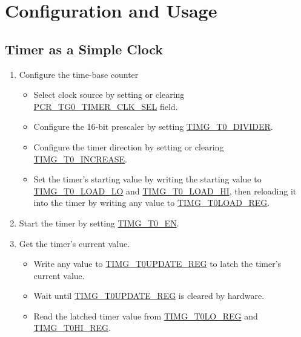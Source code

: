 \documentclass[main\_\_EN.tex]{subfiles}
\begin{document}
\section{Configuration and Usage}

\subsection{Timer as a Simple Clock}\label{sec:timg-func-descr-simple-clock}

\begin{enumerate}
    \item Configure the time-base counter
    \begin{itemize}
        \item Select clock source by setting or clearing \hyperref[fielddesc:PCRTG0TIMERCLKSEL]{PCR\_TG0\_TIMER\_CLK\_SEL} field.
        \item Configure the 16-bit prescaler by setting \hyperref[fielddesc:TIMGTXDIVIDER]{TIMG\_T0\_DIVIDER}.
        \item Configure the timer direction by setting or clearing \hyperref[fielddesc:TIMGTXINCREASE]{TIMG\_T0\_INCREASE}.
        \item Set the timer's starting value by writing the starting value to \hyperref[fielddesc:TIMGTXLOADLO]{TIMG\_T0\_LOAD\_LO} and \hyperref[fielddesc:TIMGTXLOADHI]{TIMG\_T0\_LOAD\_HI}, then reloading it into the timer by writing any value to \hyperref[regdesc:TIMGTXLOADREG]{TIMG\_T0LOAD\_REG}.
    \end{itemize}
    \item Start the timer by setting \hyperref[fielddesc:TIMGTXEN]{TIMG\_T0\_EN}.
    \item Get the timer's current value.
    \begin{itemize}
        \item  Write any value to \hyperref[regdesc:TIMGTXUPDATEREG]{TIMG\_T0UPDATE\_REG} to latch the timer's current value.
        \item Wait until \hyperref[regdesc:TIMGTXUPDATEREG]{TIMG\_T0UPDATE\_REG} is cleared by hardware.
        \item  Read the latched timer value from \hyperref[regdesc:TIMGTXLOREG]{TIMG\_T0LO\_REG} and \hyperref[regdesc:TIMGTXHIREG]{TIMG\_T0HI\_REG}.
    \end{itemize}
\end{enumerate}
\end{document}
